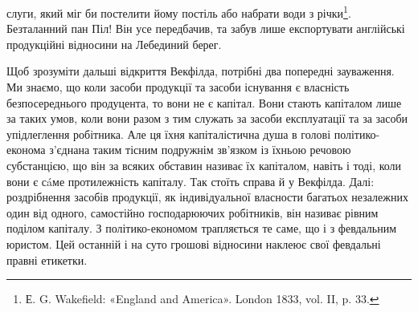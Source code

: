 \parcont{}  %
слуги, який міг би постелити йому постіль або набрати води з річки\footnote{
Е. G. Wakefield: «England and America». London 1833, vol. II, p. 33.
}. Безталанний пан Піл! Він усе
передбачив, та забув лише експортувати англійські продукційні відносини на Лебединий берег.

Щоб зрозуміти дальші відкриття Векфілда, потрібні два попередні зауваження. Ми знаємо, що коли
засоби продукції та засоби існування є власність безпосереднього продуцента, то вони не є капітал.
Вони стають капіталом лише за таких умов, коли вони разом з тим служать за засоби експлуатації та за
засоби упідлеглення робітника. Але ця їхня капіталістична душа в голові політико-економа з’єднана
таким тісним подружнім зв’язком із їхньою речовою субстанцією, що він за всяких обставин називає їх
капіталом, навіть і тоді, коли вони є сáме протилежність капіталу. Так стоїть справа й у Векфілда.
Далі: роздрібнення засобів продукції, як індивідуальної власности багатьох незалежних один від
одного, самостійно господарюючих робітників, він називає рівним поділом капіталу. З
політико-економом трапляється те саме, що і з февдальним юристом. Цей останній і на суто грошові
відносини наклеює свої февдальні правні етикетки.

